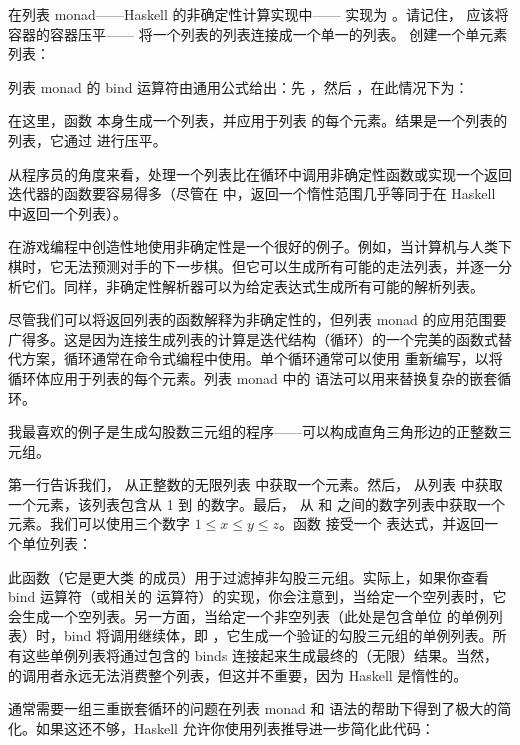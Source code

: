 在列表 monad——Haskell 的非确定性计算实现中—— 实现为 。请记住， 应该将容器的容器压平—— 将一个列表的列表连接成一个单一的列表。 创建一个单元素列表：

列表 monad 的 bind 运算符由通用公式给出：先 ，然后 ，在此情况下为：

在这里，函数  本身生成一个列表，并应用于列表  的每个元素。结果是一个列表的列表，它通过  进行压平。

从程序员的角度来看，处理一个列表比在循环中调用非确定性函数或实现一个返回迭代器的函数要容易得多（尽管在  中，返回一个惰性范围几乎等同于在 Haskell 中返回一个列表）。

在游戏编程中创造性地使用非确定性是一个很好的例子。例如，当计算机与人类下棋时，它无法预测对手的下一步棋。但它可以生成所有可能的走法列表，并逐一分析它们。同样，非确定性解析器可以为给定表达式生成所有可能的解析列表。

尽管我们可以将返回列表的函数解释为非确定性的，但列表 monad 的应用范围要广得多。这是因为连接生成列表的计算是迭代结构（循环）的一个完美的函数式替代方案，循环通常在命令式编程中使用。单个循环通常可以使用  重新编写，以将循环体应用于列表的每个元素。列表 monad 中的  语法可以用来替换复杂的嵌套循环。

我最喜欢的例子是生成勾股数三元组的程序——可以构成直角三角形边的正整数三元组。

第一行告诉我们， 从正整数的无限列表 \code{{[}1..{]}} 中获取一个元素。然后， 从列表 \code{{[}1..z{]}} 中获取一个元素，该列表包含从 1 到  的数字。最后， 从  和  之间的数字列表中获取一个元素。我们可以使用三个数字 $1 \leqslant x \leqslant y \leqslant z$。函数  接受一个  表达式，并返回一个单位列表：

此函数（它是更大类  的成员）用于过滤掉非勾股三元组。实际上，如果你查看 bind 运算符（或相关的 \code{>>} 运算符）的实现，你会注意到，当给定一个空列表时，它会生成一个空列表。另一方面，当给定一个非空列表（此处是包含单位 \code{{[}(){]}} 的单例列表）时，bind 将调用继续体，即 ，它生成一个验证的勾股三元组的单例列表。所有这些单例列表将通过包含的 binds 连接起来生成最终的（无限）结果。当然， 的调用者永远无法消费整个列表，但这并不重要，因为 Haskell 是惰性的。

通常需要一组三重嵌套循环的问题在列表 monad 和  语法的帮助下得到了极大的简化。如果这还不够，Haskell 允许你使用列表推导进一步简化此代码：

